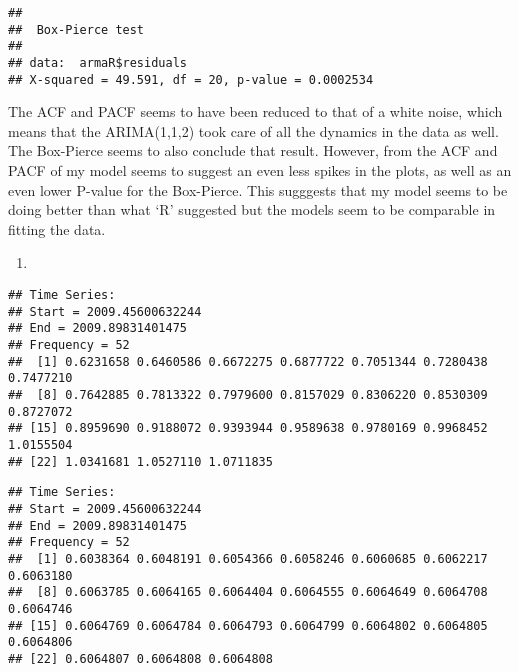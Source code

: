 \documentclass[]{article}
\newenvironment{Shaded}{\begin{snugshade}}{\end{snugshade}}
\newcommand{\KeywordTok}[1]{\textcolor[rgb]{0.13,0.29,0.53}{\textbf{#1}}}
\newcommand{\DataTypeTok}[1]{\textcolor[rgb]{0.13,0.29,0.53}{#1}}
\newcommand{\DecValTok}[1]{\textcolor[rgb]{0.00,0.00,0.81}{#1}}
\newcommand{\StringTok}[1]{\textcolor[rgb]{0.31,0.60,0.02}{#1}}
\newcommand{\CommentTok}[1]{\textcolor[rgb]{0.56,0.35,0.01}{\textit{#1}}}
\newcommand{\OperatorTok}[1]{\textcolor[rgb]{0.81,0.36,0.00}{\textbf{#1}}}
\newcommand{\NormalTok}[1]{#1}
\begin{document}
\begin{verbatim}
## 
##  Box-Pierce test
## 
## data:  armaR$residuals
## X-squared = 49.591, df = 20, p-value = 0.0002534
\end{verbatim}

The ACF and PACF seems to have been reduced to that of a white noise,
which means that the ARIMA(1,1,2) took care of all the dynamics in the
data as well. The Box-Pierce seems to also conclude that result.
However, from the ACF and PACF of my model seems to suggest an even less
spikes in the plots, as well as an even lower P-value for the
Box-Pierce. This sugggests that my model seems to be doing better than
what `R' suggested but the models seem to be comparable in fitting the
data.

\begin{enumerate}
\def\labelenumi{\alph{enumi})}
\setcounter{enumi}{6}
\item
\end{enumerate}

\begin{Shaded}
\end{Shaded}

\begin{verbatim}
## Time Series:
## Start = 2009.45600632244 
## End = 2009.89831401475 
## Frequency = 52 
##  [1] 0.6231658 0.6460586 0.6672275 0.6877722 0.7051344 0.7280438 0.7477210
##  [8] 0.7642885 0.7813322 0.7979600 0.8157029 0.8306220 0.8530309 0.8727072
## [15] 0.8959690 0.9188072 0.9393944 0.9589638 0.9780169 0.9968452 1.0155504
## [22] 1.0341681 1.0527110 1.0711835
\end{verbatim}

\begin{Shaded}
\end{Shaded}

\begin{verbatim}
## Time Series:
## Start = 2009.45600632244 
## End = 2009.89831401475 
## Frequency = 52 
##  [1] 0.6038364 0.6048191 0.6054366 0.6058246 0.6060685 0.6062217 0.6063180
##  [8] 0.6063785 0.6064165 0.6064404 0.6064555 0.6064649 0.6064708 0.6064746
## [15] 0.6064769 0.6064784 0.6064793 0.6064799 0.6064802 0.6064805 0.6064806
## [22] 0.6064807 0.6064808 0.6064808
\end{verbatim}
\end{document}
